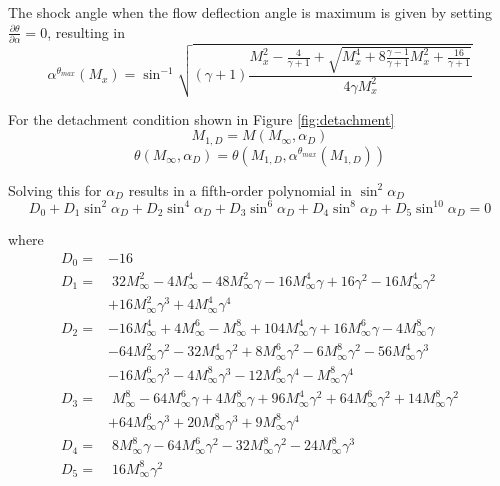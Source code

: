 The shock angle when the flow deflection angle is maximum is given by setting $\frac{\partial \theta}{\partial \alpha} = 0$, resulting in
\begin{equation}
    \alpha^{\theta_{max}}(M_x) = \sin^{-1}{\sqrt{(\gamma+1)\frac{M_x^2 - \frac{4}{\gamma+1} + \sqrt{M_x^4 + 8\frac{\gamma-1}{\gamma+1}M_x^2 + \frac{16}{\gamma+1}}}{4 \gamma M_x^2}}}
\end{equation}

For the detachment condition shown in Figure \ref{fig:detachment}
\begin{equation}
    M_{1,D} = M(M_{\infty},\alpha_D)
\end{equation}
\begin{equation}
    \theta(M_{\infty},\alpha_D) = \theta\left(M_{1,D},\alpha^{\theta_{max}}(M_{1,D})\right)
\end{equation}

Solving this for $\alpha_D$ results in a fifth-order polynomial in $\sin^2{\alpha_D}$
\begin{equation}
    D_0 + D_1 \sin^2{\alpha_D} + D_2 \sin^4{\alpha_D} + D_3 \sin^6{\alpha_D} + D_4 \sin^8{\alpha_D} + D_5 \sin^{10}{\alpha_D} = 0
\end{equation}

where
\begin{align*}
    D_0 =& -16 \\
    D_1 =& \; 32M_{\infty}^2 - 4M_{\infty}^4 - 48M_{\infty}^2\gamma - 16M_{\infty}^4\gamma + 16\gamma^2 - 16M_{\infty}^4\gamma^2 \\
         & + 16M_{\infty}^2\gamma^3 + 4M_{\infty}^4\gamma^4 \\
    D_2 =& - 16M_{\infty}^4 + 4M_{\infty}^6 - M_{\infty}^8 + 104M_{\infty}^4\gamma + 16M_{\infty}^6\gamma - 4M_{\infty}^8\gamma \\
         & - 64M_{\infty}^2\gamma^2 - 32M_{\infty}^4\gamma^2 + 8M_{\infty}^6\gamma^2 - 6M_{\infty}^8\gamma^2 -56M_{\infty}^4\gamma^3 \\
         & - 16M_{\infty}^6\gamma^3 - 4M_{\infty}^8\gamma^3 - 12M_{\infty}^6\gamma^4 - M_{\infty}^8\gamma^4 \\
    D_3 =& \; M_{\infty}^8 - 64M_{\infty}^6\gamma + 4M_{\infty}^8\gamma + 96M_{\infty}^4\gamma^2 +64M_{\infty}^6\gamma^2 + 14M_{\infty}^8\gamma^2 \\
         & + 64M_{\infty}^6\gamma^3 +20M_{\infty}^8\gamma^3 + 9M_{\infty}^8\gamma^4 \\
    D_4 =& \; 8M_{\infty}^8\gamma - 64M_{\infty}^6\gamma^2 - 32M_{\infty}^8\gamma^2 - 24M_{\infty}^8\gamma^3 \\
    D_5 =& \; 16M_{\infty}^8\gamma^2 \\
\end{align*}

